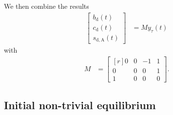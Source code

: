 \documentclass[11pt]{scrartcl}
\newcommand{\bd}{b_\mathrm{d}}
\newcommand{\cd}{c_\mathrm{d}}
\newcommand{\sda}{s_\mathrm{d,A}}
\begin{document}
We then combine the results
\begin{align*}
  \begin{bmatrix}
    \bd(t)\\
    \cd(t)\\
    \sda(t)
  \end{bmatrix}&=M y_\tau(t)
\end{align*}
with
\begin{align*}
M&=
\begin{bmatrix*}[r]
  0&0&-1&1\\
  0&0&0&1\\
  1&0&0&0
\end{bmatrix*}.
\end{align*}

\subsection{Initial non-trivial equilibrium}
\label{sec:stst}
\end{document}

